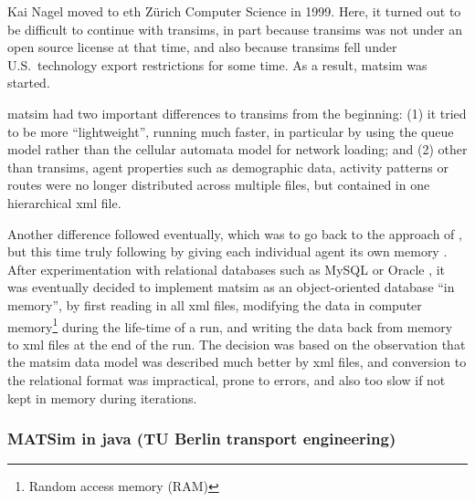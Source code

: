 Kai Nagel moved to \gls{eth} Zürich Computer Science in 1999.  Here, it turned out to be difficult to continue with \gls{transims}, in part because \gls{transims} was not under an open source license at that time, and also because \gls{transims} fell under U.S.\ technology export restrictions for some time.  As a result, \gls{matsim} was started.

\gls{matsim} had two important differences to \gls{transims} from the beginning: (1) it tried to be more ``lightweight'', \ie running much faster, in particular by using the queue model \citep{GawronPhd,Gawron1998IterativeAlgorithmto} rather than the cellular automata model for network loading; and (2) other than \gls{transims}, agent properties such as demographic data, activity patterns or routes were no longer distributed across multiple files, but contained in one hierarchical \gls{xml} file.

Another difference followed eventually, which was to go back to the approach of \citet{Nagel1996NRW}, but this time truly following \citet{ArthurBar} by giving each individual agent its own memory \citep{RaneyNagel2006traf-framework}.  After experimentation with relational databases such as MySQL \citep{mysql-wikipedia} or Oracle \citep{oracle}, it was eventually decided to implement \gls{matsim} as an object-oriented database ``in memory'', \ie by first reading in all \gls{xml} files, modifying the data in computer memory\footnote{Random access memory (RAM)} during the life-time of a run, and writing the data back from memory to \gls{xml} files at the end of the run.  The decision was based on the observation that the \gls{matsim} data model was described much better by \gls{xml} files, and conversion to the relational format was impractical, prone to errors, and also too slow if not kept in memory during iterations. 

\subsubsection{MATSim in \protect\gls{java} (TU Berlin transport engineering)}
\label{sec:matsim-in-java}

